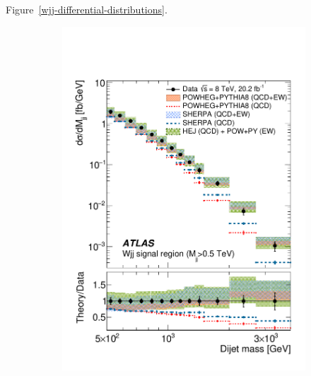 \documentclass{PoS}
\begin{document}


Figure~\ref{wjj-differential-distributions}.

\begin{figure}
  \centering
  \begin{subfigure}[t]{0.50\textwidth}
    \centering
    \includegraphics[width=.99\textwidth]{STDM-2014-11/fig_16a.pdf}\vspace{-5mm}

\end{subfigure}
\end{figure}
\end{document}
